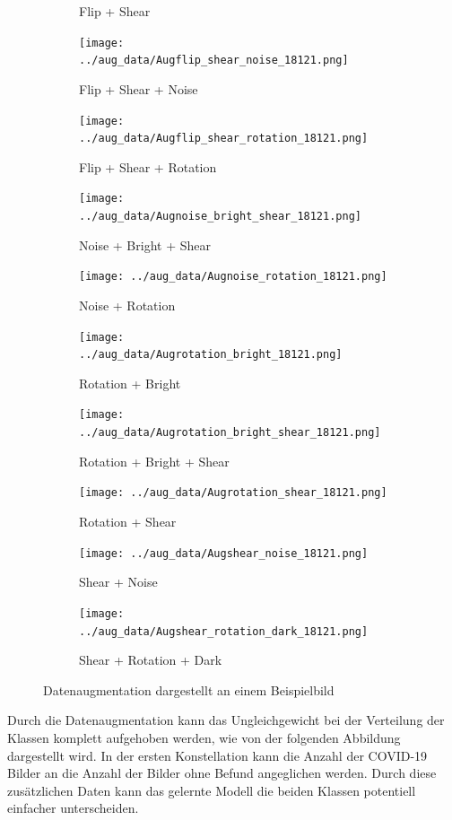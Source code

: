 \begin{figure}[H]
\begin{subfigure}[t]{0.2\textwidth}
		\caption{Flip + Shear}
	\end{subfigure} \hfill
	\begin{subfigure}[t]{0.2\textwidth}
		\texttt{[image: ../aug\_data/Augflip\_shear\_noise\_18121.png]}
		\caption{Flip + Shear + Noise}
	\end{subfigure} \hfill
	\begin{subfigure}[t]{0.2\textwidth}
		\texttt{[image: ../aug\_data/Augflip\_shear\_rotation\_18121.png]}
		\caption{Flip + Shear + Rotation}
	\end{subfigure} \hfill
	\begin{subfigure}[t]{0.2\textwidth}
		\texttt{[image: ../aug\_data/Augnoise\_bright\_shear\_18121.png]}
		\caption{Noise + Bright + Shear}
	\end{subfigure} \hfill
	\begin{subfigure}[t]{0.2\textwidth}
		\texttt{[image: ../aug\_data/Augnoise\_rotation\_18121.png]}
		\caption{Noise + Rotation}
	\end{subfigure} \hfill
	\begin{subfigure}[t]{0.2\textwidth}
		\texttt{[image: ../aug\_data/Augrotation\_bright\_18121.png]}
		\caption{Rotation + Bright}
	\end{subfigure} \hfill
	\begin{subfigure}[t]{0.2\textwidth}
		\texttt{[image: ../aug\_data/Augrotation\_bright\_shear\_18121.png]}
		\caption{Rotation + Bright + Shear}
	\end{subfigure} \hfill
	\begin{subfigure}[t]{0.2\textwidth}
		\texttt{[image: ../aug\_data/Augrotation\_shear\_18121.png]}
		\caption{Rotation + Shear}
	\end{subfigure} \hfill
	\begin{subfigure}[t]{0.2\textwidth}
		\texttt{[image: ../aug\_data/Augshear\_noise\_18121.png]}
		\caption{Shear + Noise}
	\end{subfigure} \hfill
	\begin{subfigure}[t]{0.2\textwidth}
		\texttt{[image: ../aug\_data/Augshear\_rotation\_dark\_18121.png]}
		\caption{Shear + Rotation + Dark}
	\end{subfigure} \hfill
	\caption{Datenaugmentation dargestellt an einem Beispielbild}
	\label{fig:augmentation}
\end{figure}

Durch die Datenaugmentation kann das Ungleichgewicht bei der Verteilung der Klassen komplett aufgehoben werden, wie von der folgenden Abbildung dargestellt wird.
In der ersten Konstellation kann die Anzahl der COVID-19 Bilder an die Anzahl der Bilder ohne Befund angeglichen werden. Durch diese zusätzlichen Daten kann das gelernte Modell die beiden Klassen potentiell einfacher unterscheiden.

